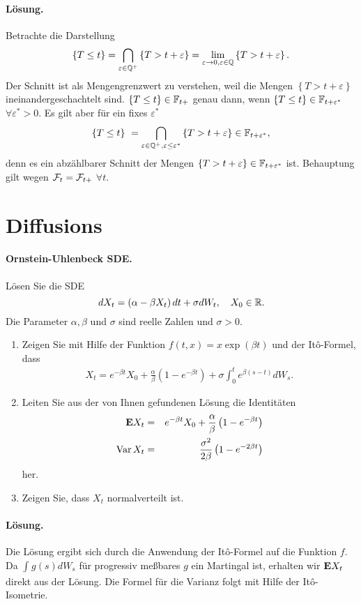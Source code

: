 \paragraph*{Lösung.}  Betrachte die Darstellung
\begin{eqnarray}
    \left\{ T \leq t \right\} = \bigcap_{\varepsilon\in\mathbb Q^{+}} \left\{ T > t+\varepsilon \right\}
    = \lim_{\varepsilon\to 0, \varepsilon\in\mathbb Q} \left\{ T > t+\varepsilon \right\}.
\end{eqnarray}
Der Schnitt ist als Mengengrenzwert zu verstehen, weil die Mengen $\left\{ T >
t+\varepsilon \right\}$ ineinandergeschachtelt sind. $\left\{ T \leq t \right\}\in \mathbb F_{t+}$
genau dann, wenn $\left\{ T \leq t \right\}\in \mathbb F_{t+\varepsilon^{*}}$ $\forall \varepsilon^{*}>0$.
Es gilt aber für ein fixes $\varepsilon^{*}$
\begin{equation}
    \left\{ T \leq t \right\}\ = 
    \bigcap_{\varepsilon\in\mathbb Q^{+}, \varepsilon\leq \varepsilon^{*}} \left\{ T > t+\varepsilon \right\} 
    \in\mathbb F_{t+\varepsilon^{*}},
\end{equation}
denn es ein abzählbarer Schnitt der Mengen $\left\{ T> t+\varepsilon
\right\}\in\mathbb F_{t+\varepsilon^{*}}$ ist. Behauptung gilt wegen $\mathcal F_t=\mathcal F_{t+}$ $\forall t$.


\section{Diffusions }

\paragraph{Ornstein-Uhlenbeck SDE.} Lösen Sie die \textsc{SDE}
\begin{equation}
    dX_t = \left( \alpha-\beta X_t \right)dt + \sigma dW_t, \quad X_0\in\mathbb R.
\end{equation}
Die Parameter $\alpha, \beta$ und $\sigma$ sind reelle Zahlen und $\sigma>0$. 
\begin{enumerate}
    \item Zeigen Sie mit Hilfe der Funktion $f(t,x)=x\exp(\beta t)$ und der It\^o-Formel, dass
        \begin{eqnarray}
            X_t = e^{-\beta t} X_0 + \frac{\alpha}{\beta}\left( 1-e^{-\beta t} \right)
                       + \sigma \int_{0}^{t} e^{\beta(s-t)} d W_s.
        \end{eqnarray}
    \item Leiten Sie aus der von Ihnen gefundenen Lösung die Identitäten
        \begin{eqnarray}
            \mathbf{E} X_t &=& e^{-\beta t} X_0 + \frac{\alpha}{\beta}\left( 1-e^{-\beta t} \right) \\
            \operatorname{Var} X_t &=& \frac{\sigma^2}{2\beta}\left( 1- e^{-2\beta t} \right)
        \end{eqnarray} 
        her.
    \item Zeigen Sie, dass $X_t$ normalverteilt ist. 
\end{enumerate}

\paragraph*{Lösung. } Die Lösung ergibt sich durch die Anwendung der It\^o-Formel
auf die Funktion $f$. Da $\int_{}^{} g(s) d W_s$ für progressiv meßbares $g$ ein
Martingal ist, erhalten wir $\mathbf{E} X_t$ direkt aus der Lösung. Die Formel für die 
Varianz folgt mit Hilfe der It\^o-Isometrie.



